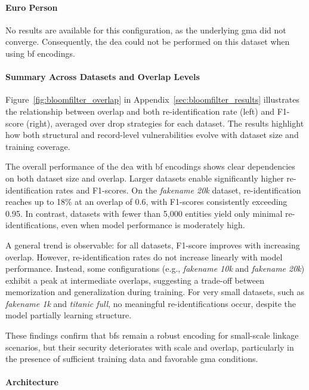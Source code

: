 \paragraph{Euro Person}

No results are available for this configuration, as the underlying \ac{gma} did not converge.
Consequently, the \ac{dea} could not be performed on this dataset when using \ac{bf} encodings.

\paragraph{Summary Across Datasets and Overlap Levels}

Figure~\ref{fig:bloomfilter_overlap} in Appendix~\ref{sec:bloomfilter_results} illustrates the relationship between overlap and both re-identification rate (left) and F1-score (right), averaged over drop strategies for each dataset.
The results highlight how both structural and record-level vulnerabilities evolve with dataset size and training coverage.

The overall performance of the \ac{dea} with \ac{bf} encodings shows clear dependencies on both dataset size and overlap.
Larger datasets enable significantly higher re-identification rates and F1-scores.
On the \textit{fakename 20k} dataset, re-identification reaches up to 18\% at an overlap of 0.6, with F1-scores consistently exceeding 0.95.
In contrast, datasets with fewer than 5{,}000 entities yield only minimal re-identifications, even when model performance is moderately high.

A general trend is observable: for all datasets, F1-score improves with increasing overlap.
However, re-identification rates do not increase linearly with model performance.
Instead, some configurations (e.g., \textit{fakename 10k} and \textit{fakename 20k}) exhibit a peak at intermediate overlaps, suggesting a trade-off between memorization and generalization during training.
For very small datasets, such as \textit{fakename 1k} and \textit{titanic full}, no meaningful re-identifications occur, despite the model partially learning structure.

These findings confirm that \ac{bf}s remain a robust encoding for small-scale linkage scenarios, but their security deteriorates with scale and overlap, particularly in the presence of sufficient training data and favorable \ac{gma} conditions.

\paragraph{Architecture}

